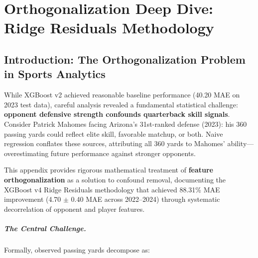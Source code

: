 %
%

\chapter{Orthogonalization Deep Dive: Ridge Residuals Methodology}
\label{app:orthogonalization}

\section{Introduction: The Orthogonalization Problem in Sports Analytics}

While XGBoost v2 achieved reasonable baseline performance (40.20 MAE on 2023 test data), careful analysis revealed a fundamental statistical challenge: \textbf{opponent defensive strength confounds quarterback skill signals}. Consider Patrick Mahomes facing Arizona's 31st-ranked defense (2023): his 360 passing yards could reflect elite skill, favorable matchup, or both. Naive regression conflates these sources, attributing all 360 yards to Mahomes' ability---overestimating future performance against stronger opponents.

This appendix provides rigorous mathematical treatment of \textbf{feature orthogonalization} as a solution to confound removal, documenting the XGBoost v4 Ridge Residuals methodology that achieved 88.31\% MAE improvement (4.70 $\pm$ 0.40 MAE across 2022--2024) through systematic decorrelation of opponent and player features.

\paragraph{The Central Challenge.}
Formally, observed passing yards decompose as:

